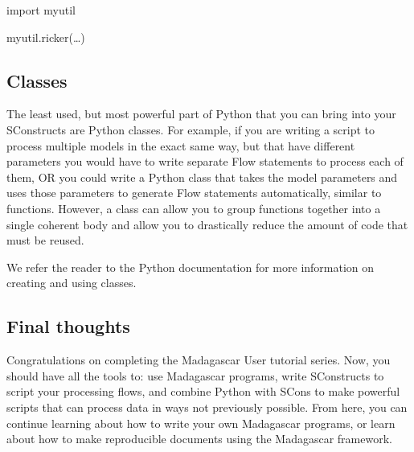 \begin{verbatimtab}[4]
import myutil

myutil.ricker(\ldots)
\end{verbatimtab}

\subsection{Classes}

The least used, but most powerful part of Python that you can bring into your SConstructs are Python classes.   For example, if you are writing a script to process multiple models in the exact same way, but that have different parameters you would have to write separate Flow statements to process each of them, OR you could write a Python class that takes the model parameters and uses those parameters to generate Flow statements automatically, similar to functions.  However, a class can allow you to group functions together into a single coherent body and allow you to drastically reduce the amount of code that must be reused.  

We refer the reader to the Python documentation for more information on creating and using classes.

\subsection{Final thoughts}

Congratulations on completing the Madagascar User tutorial series.  Now, you should have all the tools to: use Madagascar programs, write SConstructs to script your processing flows, and combine Python with SCons to make powerful scripts that can process data in ways not previously possible.  From here, you can continue learning about how to write your own Madagascar programs, or learn about how to make reproducible documents using the Madagascar framework.  


